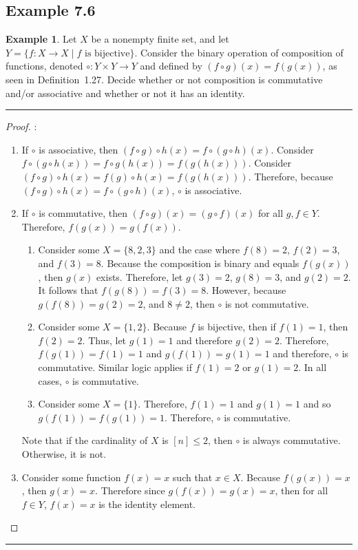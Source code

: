 \documentclass[openany, amssymb, psamsfonts]{amsart}
\newcommand{\arr}{\longrightarrow}
\theoremstyle{definition}
\newtheorem{exmp}{Example}[section]
\numberwithin{equation}{section}
\begin{document}
\subsection*{Example 7.6}
\label{7.6}
\begin{exmp}
    	Let $X$ be a nonempty finite set, and let $Y=\{f\colon X \arr X \mid \mbox{$f$ is bijective}\}$.  Consider the
	binary operation of composition of functions, denoted $\circ\colon Y \times Y \arr Y$ and defined by
	$(f \circ g)(x) = f(g(x))$, as seen in Definition~1.27.  Decide whether or not composition is commutative and/or associative and whether or not it has an identity.
\end{exmp}
\vspace{4pt}     \hrule   \vspace{4pt} 
\begin{proof}:
\begin{enumerate}
\item If $\circ$ is associative, then $(f\circ g)\circ h(x) =  f\circ (g\circ h)(x)$. Consider $f\circ (g\circ h(x)) = f \circ g(h(x))=f(g(h(x)))$. Consider $(f\circ g)\circ h(x) = f(g) \circ h(x) = f(g(h(x)))$. Therefore, because $(f\circ g)\circ h(x) =  f\circ (g\circ h)(x)$, $\circ$ is associative.
\item If $ \circ $ is commutative, then $(f \circ g) (x) = (g \circ f) (x)$ for all $g,f \in Y$. Therefore, $f(g(x)) = g(f(x))$. 
\begin{enumerate}
    \item Consider some $X = \{8,2,3\}$ and the case where $f(8) = 2$, $f(2) =3$, and $f(3) = 8$. Because the composition is binary and equals $f(g(x))$, then $g(x)$ exists. Therefore, let $g(3) =2$, $g(8) =3$, and $g(2) =2$. It follows that $f(g(8)) = f(3) =8$. However, because $g(f(8)) = g(2)  = 2$, and $8\neq 2$, then $\circ $ is not commutative.
    \item Consider some $X = \{1,2\}$. Because $f$ is bijective, then if $f(1) = 1$, then $f(2) = 2$. Thus, let $g(1) = 1$ and therefore $g(2) = 2$. Therefore, $f(g(1))=f(1) =1$ and $g(f(1))=g(1)=1$ and therefore, $\circ$ is commutative. Similar logic applies if $f(1) = 2$ or $g(1) = 2$. In all cases, $\circ$ is commutative.
    \item Consider some $X = \{1\}$. Therefore, $f(1) = 1$ and $g(1) = 1$ and so $g(f(1))=f(g(1)) = 1$. Therefore, $\circ$ is commutative.
\end{enumerate} Note that if the cardinality of $X$ is $[n]\leq 2$, then $\circ$ is always commutative. Otherwise, it is not.
\item Consider some function $f(x) =x$ such that $x\in X$. Because $f(g(x)) = x$, then $g(x) = x$. Therefore since $g(f(x)) = g(x) = x$, then for all $f\in Y$, $f(x) =x$ is the identity element.
\end{enumerate}
\end{proof}		
\vspace{4pt}     \hrule   \vspace{4pt}
\end{document}
